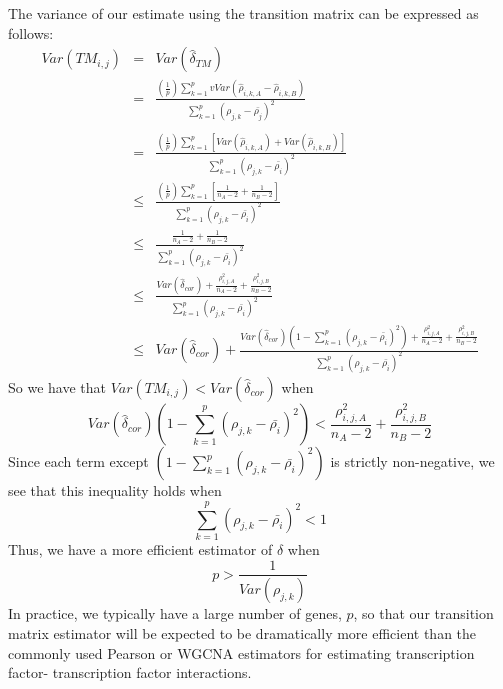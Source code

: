 \documentclass[english]{article}
\begin{document}
The variance of our estimate using the transition matrix can be expressed
as follows:
\begin{eqnarray*}
Var\left(TM_{i,j}\right) & = & Var\left(\hat{\delta}_{TM}\right)\\
 & = & \frac{\left(\frac{1}{p}\right)\sum_{k=1}^{p}vVar\left(\hat{\rho}_{i,k,A}-\hat{\rho}_{i,k,B}\right)}{\sum_{k=1}^{p}\left(\rho_{j,k}-\bar{\rho_{j}}\right)^{2}}\\
\\
 & = & \frac{\left(\frac{1}{p}\right)\sum_{k=1}^{p}\left[Var\left(\hat{\rho}_{i,k,A}\right)+Var\left(\hat{\rho}_{i,k,B}\right)\right]}{\sum_{k=1}^{p}\left(\rho_{j,k}-\bar{\rho_{i}}\right)^{2}}\\
 & \le & \frac{\left(\frac{1}{p}\right)\sum_{k=1}^{p}\left[\frac{1}{n_{A}-2}+\frac{1}{n_{B}-2}\right]}{\sum_{k=1}^{p}\left(\rho_{j,k}-\bar{\rho_{i}}\right)^{2}}\\
 & \le & \frac{\frac{1}{n_{A}-2}+\frac{1}{n_{B}-2}}{\sum_{k=1}^{p}\left(\rho_{j,k}-\bar{\rho_{i}}\right)^{2}}\\
 & \le & \frac{Var\left(\hat{\delta}_{cor}\right)+\frac{\rho_{i,j,A}^{2}}{n_{A}-2}+\frac{\rho_{i,j,B}^{2}}{n_{B}-2}}{\sum_{k=1}^{p}\left(\rho_{j,k}-\bar{\rho_{i}}\right)^{2}}\\
 & \le & Var\left(\hat{\delta}_{cor}\right)+\frac{Var\left(\hat{\delta}_{cor}\right)\left(1-\sum_{k=1}^{p}\left(\rho_{j,k}-\bar{\rho_{i}}\right)^{2}\right)+\frac{\rho_{i,j,A}^{2}}{n_{A}-2}+\frac{\rho_{i,j,B}^{2}}{n_{B}-2}}{\sum_{k=1}^{p}\left(\rho_{j,k}-\bar{\rho_{i}}\right)^{2}}
\end{eqnarray*}
So we have that $Var\left(TM_{i,j}\right)<Var\left(\hat{\delta}_{cor}\right)$
when
\[
Var\left(\hat{\delta}_{cor}\right)\left(1-\sum_{k=1}^{p}\left(\rho_{j,k}-\bar{\rho_{i}}\right)^{2}\right)<\frac{\rho_{i,j,A}^{2}}{n_{A}-2}+\frac{\rho_{i,j,B}^{2}}{n_{B}-2}
\]
Since each term except $\left(1-\sum_{k=1}^{p}\left(\rho_{j,k}-\bar{\rho_{i}}\right)^{2}\right)$
is strictly non-negative, we see that this inequality holds when 
\[
\sum_{k=1}^{p}\left(\rho_{j,k}-\bar{\rho_{i}}\right)^{2}<1
\]
Thus, we have a more efficient estimator of $\delta$ when 
\[
p>\frac{1}{Var\left(\rho_{j,k}\right)}
\]
In practice, we typically have a large number of genes, $p$, so that
our transition matrix estimator will be expected to be dramatically
more efficient than the commonly used Pearson or WGCNA estimators
for estimating transcription factor- transcription factor interactions.
\end{document}
